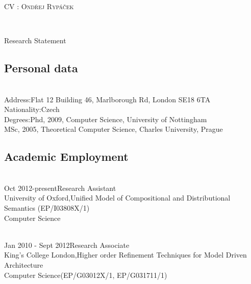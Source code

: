 \documentclass[a4paper]{article}
\begin{document}
\begin{center}\begin{Large}\textsc{CV : Ond\v{r}ej
      Ryp\'a\v{c}ek}\end{Large}\\
  \begin{large}
    Research Statement
  \end{large}

\end{center}

\subsection*{Personal data}
\begin{tabbing}
  \hspace{4cm}\= \\
  Address:\>Flat 12 Building 46, Marlborough Rd, London SE18 6TA\\
  Nationality:\>Czech\\
  Degrees:\>Phd, 2009, Computer Science, University of Nottingham\\
  \>MSc, 2005, Theoretical Computer Science, Charles University, Prague
\end{tabbing}
\subsection*{Academic Employment}
\begin{tabbing}
  \hspace{4cm}\=\\
  Oct 2012-present\>Research Assistant\\
  University of Oxford,\>Unified Model of Compositional and
  Distributional Semantics (EP/I03808X/1)\\
  Computer Science\>
\end{tabbing}
\begin{tabbing}
  \hspace{4cm}\=\\
  Jan 2010 - Sept 2012\>Research Associate\\
  King's College London,\>Higher order Refinement Techniques for Model
  Driven Architecture\\
  Computer Science\>(EP/G03012X/1, EP/G031711/1)
\end{tabbing}
\end{document}
